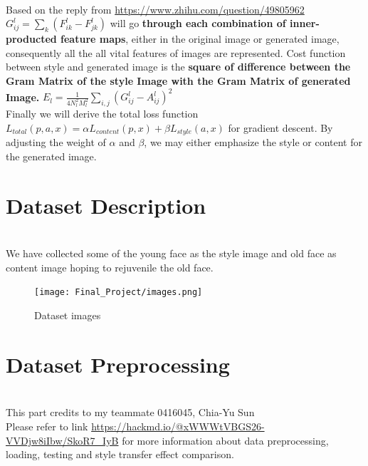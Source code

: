 \documentclass[11pt, a4paper]{article} %
\begin{document}
\\ Based on the reply from \url{https://www.zhihu.com/question/49805962}
\\ $G^{l}_{ij} = \sum_{k}(F^{l}_{ik} - F^l_{jk})$ will go \textbf{through each combination of inner-producted feature maps}, either in the original image or generated image, consequently all the all vital features of images are represented. Cost function between style and generated image is the \textbf{square of difference between the Gram Matrix of the style Image with the Gram Matrix of generated Image.} $E_{l} = \frac{1}{4N^{2}_{l}M^2_{l}} \sum_{i, j}(G^{l}_{ij} - A^l_{ij})^2$
\\ Finally we will derive the total loss function $L_{total}(p, a, x) = \alpha L_{content}(p, x) + \beta L_{style}(a, x)$ for gradient descent. By adjusting the weight of $\alpha$ and $\beta$, we may either emphasize the style or content for the generated image.

\section{Dataset Description}
\\ We have collected some of the young face as the style image and old face as content image hoping to rejuvenile the old face.
\begin{figure}[H]
    \centering
    \texttt{[image: Final\_Project/images.png]}
    \caption{Dataset images}
    \label{fig:my_label}
\end{figure}
\section{Dataset Preprocessing}
\\ This part credits to my teammate 0416045, Chia-Yu Sun
\\ Please refer to link \url{https://hackmd.io/@xWWWtVBGS26-VVDjw8iIbw/SkoR7_IyB} for more information about data preprocessing, loading, testing and style transfer effect comparison.
\end{document}
